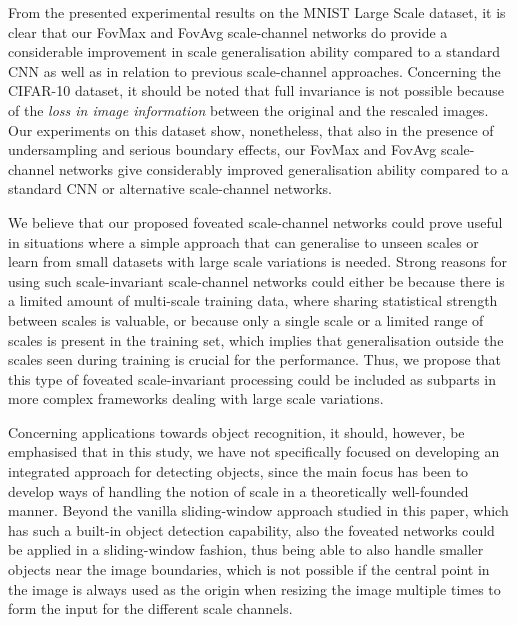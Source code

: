 \documentclass[twocolumn,runningheads]{svjour3}
\begin{document}
From the presented experimental results on the MNIST Large Scale dataset, 
it is clear that our Fov\-Max
and Fov\-Avg scale-channel networks do provide a
considerable improvement in scale generalisation ability compared to a
standard CNN as well as in relation to previous scale-channel
approaches.
Concerning the CIFAR-10 dataset, it should be noted that full invariance is not possible  because of the \emph{loss in image information} between the original and the rescaled images. 
Our experiments on this dataset show, nonetheless, that also in the presence of undersampling and serious boundary effects,
our Fov\-Max and Fov\-Avg scale-channel networks give considerably
improved generalisation ability compared to a standard CNN or alternative scale-channel networks. 

We believe that our proposed foveated scale-channel networks
could prove useful in situations where a simple approach that can
generalise to unseen scales or learn from small datasets with large
scale variations is needed.
Strong reasons for using such scale-invariant scale-channel networks
could either be because there is a limited amount of
multi-scale training data, where sharing statistical strength between
scales is valuable, or because only a single scale or a limited range of
scales is present in the training set, which implies that
generalisation outside the scales seen during training is crucial for
the performance.
Thus, we propose that this type of foveated scale-invariant
processing could be included as subparts in more complex
frameworks dealing with large scale variations.

Concerning applications towards object recognition, it should, however, be
emphasised that in this study, we have not specifically focused on
developing an integrated approach for detecting objects,
since the main focus has been to develop ways of handling the notion
of scale in a theoretically well-founded manner. Beyond the vanilla
sliding-window approach studied in this paper, which has such a built-in object detection
capability, also the foveated networks could be applied in a
sliding-window fashion, thus being able to also handle smaller objects
near the image boundaries, which is not possible if the central point
in the image is always used as the origin when resizing the image multiple
times to form the input for the different scale channels.
\end{document}
